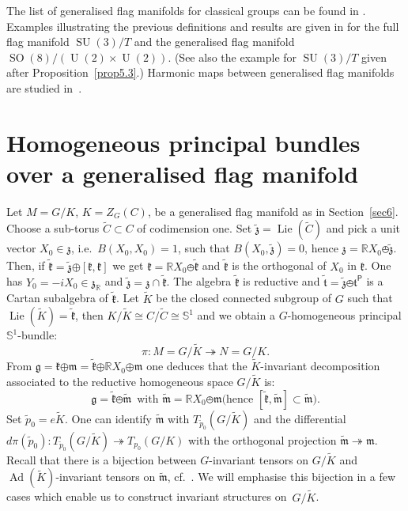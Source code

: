 \documentclass[a4paper,reqno]{amsart}
\theoremstyle{definition}
\theoremstyle{remark}
\theoremstyle{plain}
\numberwithin{equation}{section}
\newcommand{\R}{{\mathbb{R}}}
\newcommand{\bbS}{{\mathbb{S}}}
\newcommand{\g}{{\mathfrak{g}}}  %
\newcommand{\fm}{{\mathfrak{m}}}
\newcommand{\fk}{{\mathfrak{k}}}  \renewcommand{\k}{{\mathfrak{k}}}
\newcommand{\fz}{{\mathfrak{z}}}
\newcommand{\ft}{{\mathfrak{t}}}
\newcommand{\sto}{\twoheadrightarrow}
\def\SO{\operatorname {SO}}
\def\Lie{\operatorname {Lie}}
\def\Unit{\operatorname {U}}
\def\Unit{\operatorname {U}}
\def\SU{\operatorname {SU}}
\def\SO{\operatorname {SO}}
\DeclareMathOperator{\Ad}{{Ad}}
\def\boplus{\mathbin{\boldsymbol{\oplus}}}
\newcommand{\rootsP}{\mathsf{P}}
\newcommand{\Kt}{{\widetilde{K}}}
\newcommand{\wK}{{\widetilde{K}}}
\newcommand{\wk}{{\widetilde{\mathfrak{k}}}}
\newcommand{\wt}{{\widetilde{\mathfrak{t}}}}
\newcommand{\wz}{{\widetilde{\mathfrak{z}}}}
\newcommand{\wm}{{\widetilde{\mathfrak{m}}}}
\newcommand{\wpzero}{{\tilde{p}_0}}
\newcommand{\pzero}{{p_0}}
\begin{document}
The list of generalised flag manifolds for classical groups can
be found in \cite[Chapter~7, \S 4, p.~100]{Arv}. \\
Examples illustrating the previous definitions and results are
given in \cite[Chapter~7,  \S\S~5 \& 8, pp.~102-103 \&
109-111]{Arv} for the full flag manifold $\SU(3)/T$ and the
generalised flag manifold $\SO(8)/(\Unit(2) \times \Unit(2))$.
(See also the example for  $\SU(3)/T$ given after Proposition~\ref{prop5.3}.)
Harmonic maps between generalised flag manifolds are studied in~\cite{Guest}.


\section{Homogeneous principal bundles over a generalised flag manifold}
\label{sec7}

Let $M=G/K$, $K= Z_G(C)$, be a generalised flag manifold  as in
Section~\ref{sec6}. 
Choose a sub-torus $\widetilde{C} \subset C$ of codimension
one. Set $\wz = \Lie(\widetilde{C})$ and pick a unit vector
$X_0 \in \fz$, i.e.~$B(X_0,X_0) =1$, such that $B(X_0,\wz) =0$,
hence $\fz= \R X_0 \obot \wz$. Then, if
$\wk= \wz \boplus [\fk,\fk]$ we get $\fk= \R X_0 \obot \wk$
and $\wk$ is the orthogonal of $X_0$ in $\fk$.
  One has $Y_0 = -i X_0 \in \fz_\R$
  and $ \wz  = \fz \cap
    \wk$.
  The algebra $\wk$ is reductive and
  $\wt = \wz \obot \ft^{\rootsP}$ is a Cartan subalgebra of
  $\wk$. 
  Let $\wK$ be the
  closed connected subgroup of $G$ such that $\Lie(\wK) = \wk$, 
   then $K/\wK \cong  C/\widetilde{C} \cong \bbS^1$ and 
we obtain a $G$-homogeneous principal $\bbS^1$-bundle:
  \begin{equation*}
    \label{eq.bundle}
    \pi :   M=G/\wK \sto N=G/K.
  \end{equation*}
  From $\g = \fk \boplus \fm = \wk \boplus \R X_0 \boplus \fm$ one
deduces that the $\wK$-invariant  decomposition associated to the
reductive homogeneous space $G/\wK$ is:
\[
  \g= \wk \obot \wm \ \; \text{with $\wm = \R X_0 \obot \fm$
    (hence $[\wk,\wm] \subset \wm$)}.
\]
Set $\wpzero= e\wK$. One can identify $\wm$ with $T_\wpzero (G/\Kt)$
and the differential
$d\pi(\wpzero) : T_\wpzero (G/\Kt) \sto T_\pzero (G/K)$  with
the orthogonal projection $\wm \sto \fm$. Recall that there is a
bijection between $G$-invariant tensors on $G/\Kt$ and
$\Ad(\wK)$-invariant tensors on $\wm$, cf.~\cite{CS}. We will
emphasise this bijection in a few cases which enable us to
construct invariant structures on~$G/\Kt$.
    
\end{document}
